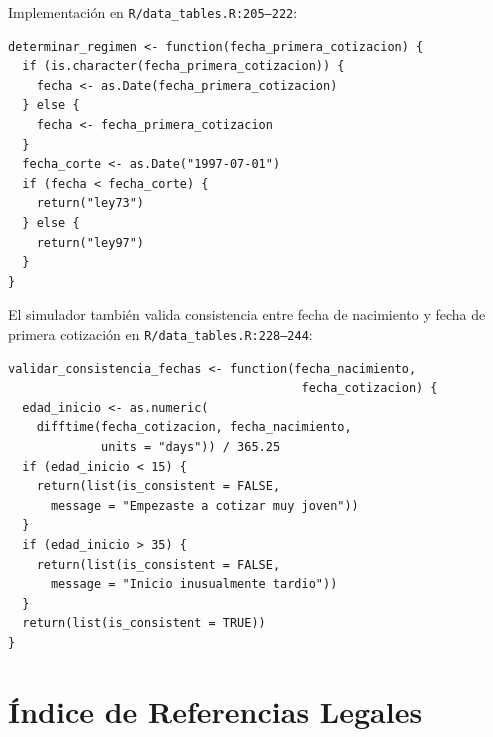 \documentclass[11pt,a4paper]{report}
\begin{document}
\begin{tcolorbox}[colback=orange!5!white, colframe=orange!75!black, title=\textbf{Aplicaci\'on en C\'odigo}]
Implementaci\'on en \texttt{R/data\_tables.R:205--222}:

\begin{lstlisting}
determinar_regimen <- function(fecha_primera_cotizacion) {
  if (is.character(fecha_primera_cotizacion)) {
    fecha <- as.Date(fecha_primera_cotizacion)
  } else {
    fecha <- fecha_primera_cotizacion
  }
  fecha_corte <- as.Date("1997-07-01")
  if (fecha < fecha_corte) {
    return("ley73")
  } else {
    return("ley97")
  }
}
\end{lstlisting}

El simulador tambi\'en valida consistencia entre fecha de nacimiento y fecha de primera cotizaci\'on en \texttt{R/data\_tables.R:228--244}:
\begin{lstlisting}
validar_consistencia_fechas <- function(fecha_nacimiento,
                                         fecha_cotizacion) {
  edad_inicio <- as.numeric(
    difftime(fecha_cotizacion, fecha_nacimiento,
             units = "days")) / 365.25
  if (edad_inicio < 15) {
    return(list(is_consistent = FALSE,
      message = "Empezaste a cotizar muy joven"))
  }
  if (edad_inicio > 35) {
    return(list(is_consistent = FALSE,
      message = "Inicio inusualmente tardio"))
  }
  return(list(is_consistent = TRUE))
}
\end{lstlisting}
\end{tcolorbox}

\appendix
\chapter{\'Indice de Referencias Legales}
\end{document}
